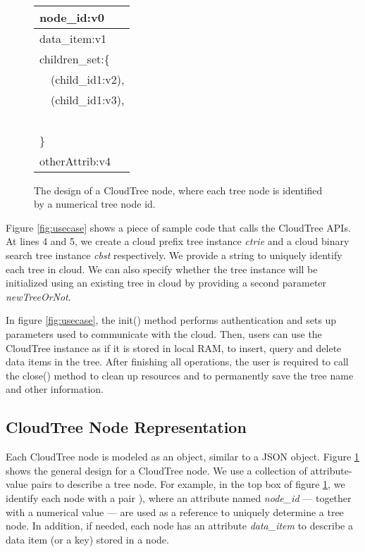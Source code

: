 \documentclass[10pt, conference, compsocconf]{IEEEtran}
\begin{document}
\begin{figure}
\begin{center}
 \begin{minipage}[c]{1.2in}
{\tt \scriptsize
\begin{tabular}{|l|}
 \hline
node\_id:v0\\
\hline
data\_item:v1\\
children\_set:\{\\
\ \ (child\_id1:v2), \\
\ \ (child\_id1:v3), \\
\ \ \;\\
\}\\
otherAttrib:v4\\
\hline 
\end{tabular}
}
\end{minipage}
 \begin{minipage}[c]{1.0in}
\caption{The design of a CloudTree node,  where each tree node is identified by a numerical tree node id. }
\label{fig:nodedesign}
\end{minipage}
\end{center}
\end{figure}


Figure \ref{fig:usecase} shows a piece of sample code that calls the CloudTree APIs.
At lines 4 and 5, we create a cloud prefix tree instance \emph{ctrie} and a cloud binary search tree instance \emph{cbst} respectively.
We provide a string  to uniquely identify each tree in cloud. We can also specify whether the tree instance will be initialized using an existing tree in cloud by providing a second parameter \emph{newTreeOrNot}. 

In figure \ref{fig:usecase}, the init() method performs authentication and sets up parameters used to communicate with the cloud.
Then, users can use the CloudTree instance as if it is stored in local RAM, to insert, query and delete data items in the tree.
After finishing all operations, the user is required to call the close() method to clean up resources and to permanently save the tree name and other information.


\subsection{CloudTree Node Representation}
Each CloudTree node is modeled as an object, similar to a JSON object.
Figure \ref{fig:nodedesign} shows the general design for a CloudTree node.
We use a collection of attribute-value pairs to describe a tree node. For example, in the 
top box of figure \ref{fig:nodedesign},
we identify each node with a pair ), where an attribute named \emph{node\_id} --- 
together with a numerical value  --- are used as a reference 
to uniquely determine a tree node.
In addition, if needed, each node has an attribute \emph{data\_item} to describe a
data item (or a key) stored in a node.
\end{document}
